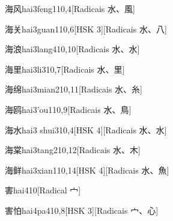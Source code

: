 \begin{entry}{海风}{hai3feng1}{10,4}[Radicais ⽔、⾵]
\end{entry}

\begin{entry}{海关}{hai3guan1}{10,6}[HSK 3][Radicais ⽔、⼋]
\end{entry}

\begin{entry}{海浪}{hai3lang4}{10,10}[Radicais ⽔、⽔]
\end{entry}

\begin{entry}{海里}{hai3li3}{10,7}[Radicais ⽔、⾥]
\end{entry}

\begin{entry}{海绵}{hai3mian2}{10,11}[Radicais ⽔、⽷]
\end{entry}

\begin{entry}{海鸥}{hai3'ou1}{10,9}[Radicais ⽔、⿃]
\end{entry}

\begin{entry}{海水}{hai3 shui3}{10,4}[HSK 4][Radicais ⽔、⽔]
\end{entry}

\begin{entry}{海棠}{hai3tang2}{10,12}[Radicais ⽔、⽊]
\end{entry}

\begin{entry}{海鲜}{hai3xian1}{10,14}[HSK 4][Radicais ⽔、⿂]
\end{entry}

\begin{entry}{害}{hai4}{10}[Radical ⼧]
\end{entry}

\begin{entry}{害怕}{hai4pa4}{10,8}[HSK 3][Radicais ⼧、⼼]
\end{entry}

